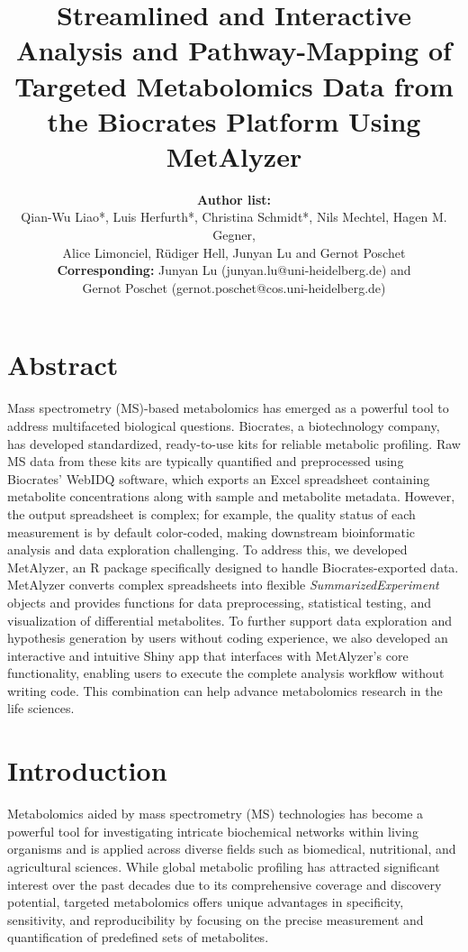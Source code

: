 \documentclass[12pt, a4paper]{article}
\title{
    \vspace{-25mm}
    \large \bfseries Streamlined and Interactive Analysis and Pathway-Mapping of Targeted Metabolomics Data from the Biocrates Platform Using MetAlyzer
    \vspace{-4mm}
    }
\author{
    \vspace{-2mm}
    \hspace{-124mm} \small \textbf{Author list:}\\
    \vspace{-3mm} \small Qian-Wu Liao*, Luis Herfurth*, Christina Schmidt*, Nils Mechtel, Hagen M. Gegner,\\
    \hspace{-41mm} \small Alice Limonciel, Rüdiger Hell, Junyan Lu and Gernot Poschet\\
    \hspace{-37mm} \vspace{-3mm} \small \textbf{Corresponding:} Junyan Lu (junyan.lu@uni-heidelberg.de) and\\
    \hspace{9mm} \small Gernot Poschet (gernot.poschet@cos.uni-heidelberg.de)
    }
\date{}
\begin{document}
\maketitle

\section*{\large Abstract}
Mass spectrometry (MS)-based metabolomics has emerged as a powerful tool to address multifaceted biological questions. Biocrates, a biotechnology company, has developed standardized, ready-to-use kits for reliable metabolic profiling. Raw MS data from these kits are typically quantified and preprocessed using Biocrates' WebIDQ software, which exports an Excel spreadsheet containing metabolite concentrations along with sample and metabolite metadata. However, the output spreadsheet is complex; for example, the quality status of each measurement is by default color-coded, making downstream bioinformatic analysis and data exploration challenging. To address this, we developed MetAlyzer, an R package specifically designed to handle Biocrates-exported data. MetAlyzer converts complex spreadsheets into flexible \textit{SummarizedExperiment} objects and provides functions for data preprocessing, statistical testing, and visualization of differential metabolites. To further support data exploration and hypothesis generation by users without coding experience, we also developed an interactive and intuitive Shiny app that interfaces with MetAlyzer's core functionality, enabling users to execute the complete analysis workflow without writing code. This combination can help advance metabolomics research in the life sciences.

\section*{\large Introduction}
Metabolomics aided by mass spectrometry (MS) technologies has become a powerful tool for investigating intricate biochemical networks within living organisms and is applied across diverse fields such as biomedical, nutritional, and agricultural sciences\cite{Gowda2008,Gomez-Casati2013,Gonzalez-Covarrubias2022}. While global metabolic profiling has attracted significant interest over the past decades due to its comprehensive coverage and discovery potential, targeted metabolomics offers unique advantages in specificity, sensitivity, and reproducibility by focusing on the precise measurement and quantification of predefined sets of metabolites\cite{Begou2017}.
\end{document}
